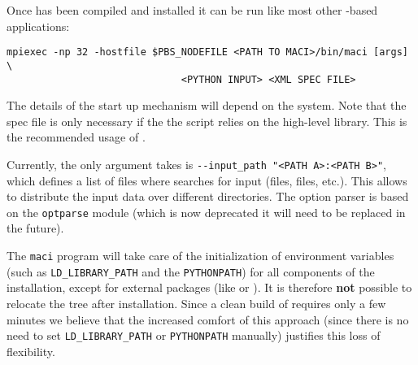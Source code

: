 
Once \MACI has been compiled and installed it can be run like most other \MPI-based applications:
\begin{lstlisting}[style=SHELL]
mpiexec -np 32 -hostfile $PBS_NODEFILE <PATH TO MACI>/bin/maci [args] \
                              <PYTHON INPUT> <XML SPEC FILE>
\end{lstlisting}
The details of the \MPI start up mechanism will depend on the system. Note that the \XML spec file is only necessary if the the \PYTHON script relies on the high-level \PYTHON library. This is the recommended usage of \MACI. 

Currently, the only argument \MACI takes is \lstinline[style=SHELL]|--input_path "<PATH A>:<PATH B>"|, which defines a list of files where \MACI searches for input (\XML files, \PYTHON files, etc.). This allows to distribute the input data over different directories. The option parser is based on the \lstinline[style=CODE]|optparse| module (which is now deprecated it will need to be replaced in the future).

The \lstinline[style=SHELL]|maci| program will take care of the initialization of environment variables (such as \lstinline[style=SHELL]|LD_LIBRARY_PATH| and the \lstinline[style=SHELL]|PYTHONPATH|) for all components of the installation, except for external packages (like \TRILINOS or \PETSC). It is therefore \textbf{not} possible to relocate the \MACI tree after installation. Since a clean build of \MACI requires only a few minutes we believe that the increased comfort of this approach (since there is no need to set \lstinline[style=SHELL]|LD_LIBRARY_PATH| or \lstinline[style=SHELL]|PYTHONPATH| manually) justifies this loss of flexibility.
